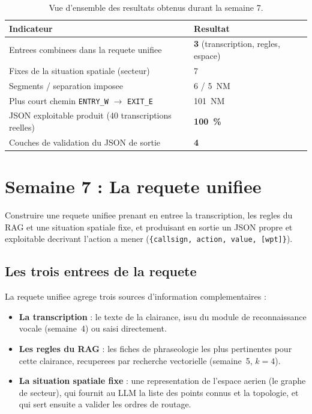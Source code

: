 \documentclass[11pt,a4paper]{article}
\begin{document}
\begin{table}[h]
\centering
\small
\begin{tabular}{>{\raggedright}p{8.7cm} l}
\toprule
\rowcolor{lightgray}\textbf{Indicateur} & \textbf{Resultat}\\
\midrule
Entrees combinees dans la requete unifiee & \textbf{3} (transcription, regles, espace)\\
Fixes de la situation spatiale (secteur) & 7\\
Segments / separation imposee & 6 / 5~NM\\
Plus court chemin \texttt{ENTRY\_W} $\rightarrow$ \texttt{EXIT\_E} & 101~NM\\
JSON exploitable produit (40 transcriptions reelles) & \textbf{100~\%}\\
Couches de validation du JSON de sortie & \textbf{4}\\
\bottomrule
\end{tabular}
\caption{Vue d'ensemble des resultats obtenus durant la semaine 7.}
\end{table}

\section{Semaine 7 : La requete unifiee}

\begin{objbox}
Construire une requete unifiee prenant en entree la transcription, les regles du RAG
et une situation spatiale fixe, et produisant en sortie un JSON propre et exploitable
decrivant l'action a mener (\texttt{\{callsign, action, value, [wpt]\}}).
\end{objbox}

\subsection{Les trois entrees de la requete}

La requete unifiee agrege trois sources d'information complementaires :

\begin{itemize}
  \item \textbf{La transcription} : le texte de la clairance, issu du module de
  reconnaissance vocale (semaine~4) ou saisi directement.
  \item \textbf{Les regles du RAG} : les fiches de phraseologie les plus pertinentes
  pour cette clairance, recuperees par recherche vectorielle (semaine~5, $k = 4$).
  \item \textbf{La situation spatiale fixe} : une representation de l'espace aerien
  (le graphe de secteur), qui fournit au LLM la liste des points connus et la
  topologie, et qui sert ensuite a valider les ordres de routage.
\end{itemize}
\end{document}
